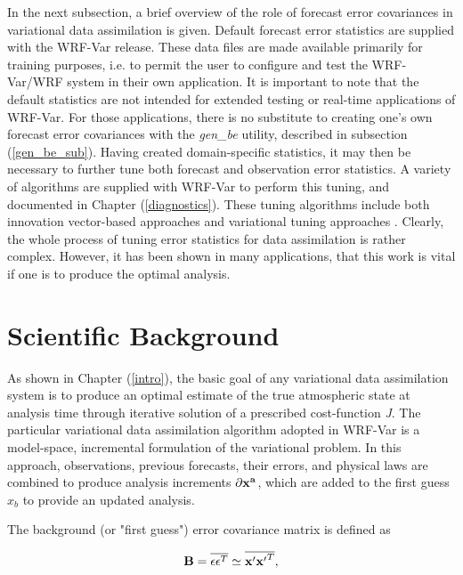In the next subsection, a brief overview of the role of forecast error covariances in variational data assimilation is given. Default forecast error statistics are supplied with the WRF-Var release. These data files are made available primarily for training purposes, i.e. to permit the user to configure and test the WRF-Var/WRF system in their own application. It is important to note that the default statistics are not intended for extended testing or real-time applications of WRF-Var. For those applications, there is no substitute to creating one's own forecast error covariances with the {\it gen\_be} utility, described in subsection (\ref{gen_be_sub}). Having created domain-specific statistics, it may then be necessary to further tune both forecast and observation error statistics. A variety of algorithms are supplied with WRF-Var to perform this tuning, and documented in Chapter (\ref{diagnostics}). These tuning algorithms include both innovation vector-based approaches \citep{hollingsworth86}
and variational tuning approaches \citep{desroziers01}. Clearly, the whole process of tuning error statistics for data assimilation is rather complex. However, it has been shown in many applications, that this work is vital if one is to produce the optimal analysis.

\section{Scientific Background}

As shown in Chapter (\ref{intro}), the basic goal of any variational data assimilation system is to produce an optimal estimate of the true atmospheric state at analysis time through iterative solution of a prescribed cost-function {\it J}. The particular variational data assimilation algorithm adopted in WRF-Var is a model-space, incremental formulation of the variational problem.  In this approach, observations, previous forecasts, their errors, and physical laws are combined to produce analysis increments ${\partial \bf x^{a}}$, which are added to the first guess $x_{b}$ to provide an updated analysis.

The background (or "first guess") error covariance matrix is defined as 

\begin{equation}
{\bf B}=\overline{\epsilon \epsilon^{T}} \simeq \overline{{\bf x'}{\bf x'}^{T}},
\label{var-b}
\end{equation}


